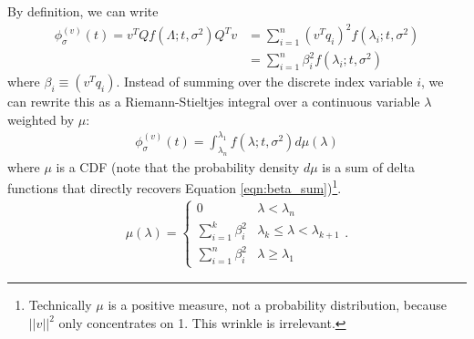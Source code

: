\documentclass{article}
\newcommand{\phis}{\phi_{\sigma}}
\newcommand{\phisv}{\phis^{(v)}}
\begin{document}
By definition, we can write
\begin{align} \label{eqn:beta_sum}
\phisv(t) = v^T Q f(\Lambda; t, \sigma^2) Q^T v &= \sum_{i=1}^n (v^T q_i)^2 f(\lambda_i; t, \sigma^2) \nonumber \\
&= \sum_{i=1}^n \beta_i^2 f(\lambda_i; t, \sigma^2)
\end{align}
where $\beta_i \equiv (v^T q_i)$. Instead of summing over the discrete index variable $i$, we can rewrite this as a Riemann-Stieltjes integral over a continuous variable $\lambda$ weighted by $\mu$:
\begin{align} \label{eqn:integral}
\phisv(t) = \int_{\lambda_n}^{\lambda_1} f(\lambda; t, \sigma^2) d\mu(\lambda)
\end{align}
where $\mu$ is a CDF (note that the probability density $d \mu$ is a sum of delta functions that directly recovers Equation \ref{eqn:beta_sum})\footnote{Technically $\mu$ is a positive measure, not a probability distribution, because $||v||^2$ only concentrates on 1. This wrinkle is irrelevant.}.
\begin{align*}
  \mu(\lambda) = \begin{cases} 0 & \lambda < \lambda_n \\
  \sum_{i=1}^k \beta_i^2 & \lambda_k \le \lambda < \lambda_{k+1} \\
   \sum_{i=1}^n \beta_i^2 & \lambda \ge \lambda_1\end{cases}.
\end{align*}
\end{document}
